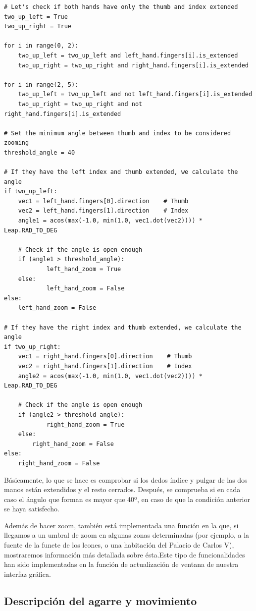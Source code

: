 \documentclass[11pt,a4paper]{article}
\begin{document}
\begin{lstlisting}
# Let's check if both hands have only the thumb and index extended
two_up_left = True
two_up_right = True

for i in range(0, 2):
	two_up_left = two_up_left and left_hand.fingers[i].is_extended
    two_up_right = two_up_right and right_hand.fingers[i].is_extended

for i in range(2, 5):
	two_up_left = two_up_left and not left_hand.fingers[i].is_extended
    two_up_right = two_up_right and not right_hand.fingers[i].is_extended

# Set the minimum angle between thumb and index to be considered zooming
threshold_angle = 40

# If they have the left index and thumb extended, we calculate the angle
if two_up_left:
	vec1 = left_hand.fingers[0].direction    # Thumb
	vec2 = left_hand.fingers[1].direction    # Index
    angle1 = acos(max(-1.0, min(1.0, vec1.dot(vec2)))) * Leap.RAD_TO_DEG

    # Check if the angle is open enough
    if (angle1 > threshold_angle):
    		left_hand_zoom = True
	else:
    		left_hand_zoom = False
else:
	left_hand_zoom = False

# If they have the right index and thumb extended, we calculate the angle
if two_up_right:
	vec1 = right_hand.fingers[0].direction    # Thumb
    vec2 = right_hand.fingers[1].direction    # Index
    angle2 = acos(max(-1.0, min(1.0, vec1.dot(vec2)))) * Leap.RAD_TO_DEG

    # Check if the angle is open enough
    if (angle2 > threshold_angle):
    		right_hand_zoom = True
	else:
		right_hand_zoom = False
else:
	right_hand_zoom = False
\end{lstlisting}

Básicamente, lo que se hace es comprobar si los dedos índice y pulgar de las dos
manos están extendidos y el resto cerrados. Después, se comprueba si en cada
caso el ángulo que forman es mayor que 40º, en caso de que la condición anterior
se haya satisfecho.

Además de hacer zoom, también está implementada una función en la que, si llegamos a un umbral de zoom en algunas zonas determinadas (por ejemplo,
a la fuente de la funete de los leones, o una habitación del Palacio de Carlos V), mostraremos información más detallada sobre ésta.Este tipo de
funcionalidades han sido implementadas en la función de actualización de ventana de nuestra interfaz gráfica.


\subsection{Descripción del agarre y movimiento}
\end{document}
